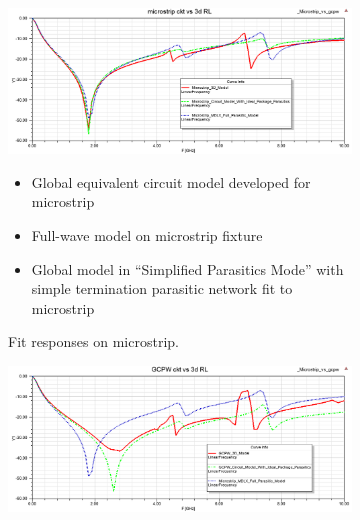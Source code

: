 \documentclass[12pt]{usfcoe}
\begin{document}
        \begin{figure}
            \centering
			    \begin{subfigure}{\textwidth}
                    \includegraphics[width=\linewidth]{images/mstrip_v_gcpw/microstrip_comparison.png}
            \vspace{-\topsep}
            \begin{itemize}
                \centering
                \setlength{\parskip}{0pt}
                \setlength{\itemsep}{0pt} 
                \color{blue}
                \item Global equivalent circuit model developed for microstrip
                \color{red}
                \item Full-wave model on microstrip fixture
                \color{green}
                \item Global model in ``Simplified Parasitics Mode'' with simple termination parasitic network fit to microstrip
            \end{itemize}
            \vspace*{-9pt}
                    \caption{Fit responses on microstrip.}
                    \label{fig:mstrip_gcpw_comparisona}
                \end{subfigure}
                \hfill
			    \begin{subfigure}{\textwidth}
                    \includegraphics[width=\linewidth]{images/mstrip_v_gcpw/gcpw_comparison.png}

\end{subfigure}
\end{figure}
\end{document}
